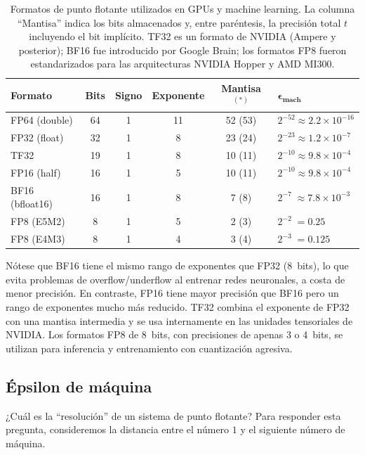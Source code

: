 \documentclass[a4paper,11pt]{report}
\begin{document}
\begin{table}[h]
\centering
\begin{tabular}{@{}lccccl@{}}
\toprule
\textbf{Formato} & \textbf{Bits} & \textbf{Signo} & \textbf{Exponente} & \textbf{Mantisa}${}^{(*)}$ & $\boldsymbol{\epsilon_{\text{mach}}}$ \\
\midrule
FP64 (double)  & 64 & 1 & 11 & 52 (53) & $2^{-52}\approx 2.2\times 10^{-16}$ \\
FP32 (float)   & 32 & 1 &  8 & 23 (24) & $2^{-23}\approx 1.2\times 10^{-7}$ \\
TF32           & 19 & 1 &  8 & 10 (11) & $2^{-10}\approx 9.8\times 10^{-4}$ \\
FP16 (half)    & 16 & 1 &  5 & 10 (11) & $2^{-10}\approx 9.8\times 10^{-4}$ \\
BF16 (bfloat16)& 16 & 1 &  8 &  7 \phantom{0}(8)  & $2^{-7}\;\approx 7.8\times 10^{-3}$ \\
FP8 (E5M2)     &  8 & 1 &  5 &  2 \phantom{0}(3)  & $2^{-2}\;= 0.25$ \\
FP8 (E4M3)     &  8 & 1 &  4 &  3 \phantom{0}(4)  & $2^{-3}\;= 0.125$ \\
\bottomrule
\end{tabular}
\caption{Formatos de punto flotante utilizados en GPUs y machine learning. La columna ``Mantisa'' indica los bits almacenados y, entre paréntesis, la precisión total $t$ incluyendo el bit implícito. TF32 es un formato de NVIDIA (Ampere y posterior); BF16 fue introducido por Google Brain; los formatos FP8 fueron estandarizados para las arquitecturas NVIDIA Hopper y AMD MI300.}
\label{tab:formatos_flotante}
\end{table}

Nótese que BF16 tiene el mismo rango de exponentes que FP32 (8~bits), lo que evita problemas de overflow/underflow al entrenar redes neuronales, a costa de menor precisión.  En contraste, FP16 tiene mayor precisión que BF16 pero un rango de exponentes mucho más reducido.  TF32 combina el exponente de FP32 con una mantisa intermedia y se usa internamente en las unidades tensoriales de NVIDIA.  Los formatos FP8 de 8~bits, con precisiones de apenas 3 o 4~bits, se utilizan para inferencia y entrenamiento con cuantización agresiva.

\subsection{Épsilon de máquina}\label{subsec:epsilon_maquina}

¿Cuál es la ``resolución'' de un sistema de punto flotante? Para responder esta pregunta, consideremos la distancia entre el número $1$ y el siguiente número de máquina.
\end{document}
